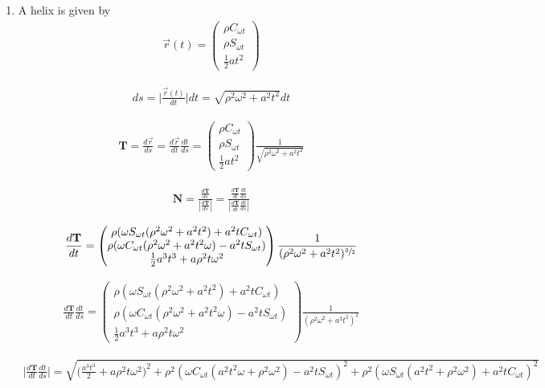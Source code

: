 \documentclass[11pt,a4paper]{article}
\begin{document}
\begin{enumerate}

\item[]

A helix is given by
\begin{align}
\vec{r}(t)=
\begin{pmatrix}
\rho C_{\omega t} \\
\rho S_{\omega t} \\
\frac{1}{2}at^2
\end{pmatrix}
\end{align}

\begin{align}
ds
=\Big|\frac{\vec{r}(t)}{dt}\Big|dt
=\sqrt{\rho^2\omega^2+a^2t^2}dt
\end{align}

\begin{align}
\mathbf{T}
=\frac{d\vec{r}}{ds}
=\frac{d\vec{r}}{dt}\frac{dt}{ds}
=
\begin{pmatrix}
\rho C_{\omega t} \\
\rho S_{\omega t} \\
\frac{1}{2}at^2
\end{pmatrix}
\frac{1}{\sqrt{\rho^2\omega^2+a^2t^2}}
\end{align}

\begin{align}
\mathbf{N}
=\frac{\frac{d\mathbf{T}}{ds}}{|\frac{d\mathbf{T}}{ds}|}
=\frac{\frac{d\mathbf{T}}{dt}\frac{dt}{ds}}{|\frac{d\mathbf{T}}{dt}\frac{dt}{ds}|}
\end{align}

\begin{align}
\frac{d\mathbf{T}}{dt}
=
\begin{pmatrix}
\rho(\omega S_{\omega t}(\rho^2\omega^2+a^2t^2)+a^2t C_{\omega t}) \\
\rho(\omega C_{\omega t}(\rho^2\omega^2+a^2t^2\omega)-a^2t S_{\omega t}) \\
\frac{1}{2}a^3t^3+a\rho^2t\omega^2
\end{pmatrix}
\frac{1}{(\rho^2\omega^2+a^2t^2)^{\sfrac{3}{2}}}
\end{align}

\begin{align}
\frac{d\mathbf{T}}{dt}\frac{dt}{ds}
=
\begin{pmatrix}
\rho(\omega S_{\omega t}(\rho^2\omega^2+a^2t^2)+a^2t C_{\omega t}) \\
\rho(\omega C_{\omega t}(\rho^2\omega^2+a^2t^2\omega)-a^2t S_{\omega t}) \\
\frac{1}{2}a^3t^3+a\rho^2t\omega^2
\end{pmatrix}
\frac{1}{(\rho^2\omega^2+a^2t^2)^2}
\end{align}

\begin{align}
\big|\frac{d\mathbf{T}}{dt}\frac{dt}{ds}\big|
=
\sqrt{\bigg(\frac{a^3t^3}{2}+a\rho^2t\omega^2\bigg)^2+\rho^2(\omega C_{\omega t}(a^2t^2\omega+\rho^2\omega^2)-a^2t S_{\omega t})^2+\rho^2(\omega S_{\omega t}(a^2t^2+\rho^2\omega^2)+a^2t C_{\omega t})^2}
\end{align}

\end{enumerate}
\end{document}
